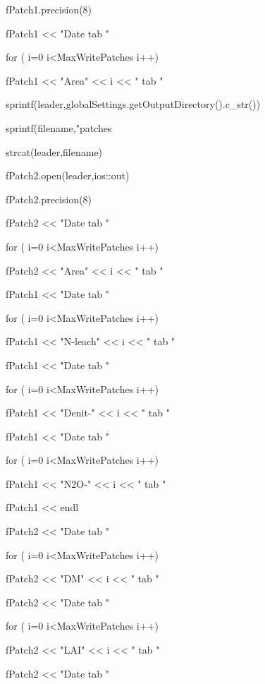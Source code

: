 \documentclass[%
]{scrartcl}
\begin{document}
      \quad fPatch1.precision(8)
      
      \quad fPatch1 << "Date tab "
      
      \quad for ( i=0 i<MaxWritePatches i++)
      
       \quad \quad   fPatch1 << "Area" << i << " tab "


      \quad \quad sprintf(leader,globalSettings.getOutputDirectory().c\_str())
	  
	  \quad  \quad sprintf(filename,"patches%
      
       \quad strcat(leader,filename)
     
       \quad fPatch2.open(leader,ios::out)
     
      \quad fPatch2.precision(8)
     
      \quad fPatch2 << "Date tab "
     
      \quad for ( i=0 i<MaxWritePatches i++)
     
      \quad \quad    fPatch2 << "Area" << i << " tab "

     \quad  fPatch1 << "Date tab "
      
     \quad  for ( i=0 i<MaxWritePatches i++)
       
     \quad    \quad  fPatch1 << "N-leach" << i << " tab "
      
     \quad  fPatch1 << "Date tab "
      
      \quad for ( i=0 i<MaxWritePatches i++)
      
     \quad   \quad   fPatch1 << "Denit-" << i << " tab "
     
    \quad   fPatch1 << "Date tab "
     
     \quad  for ( i=0 i<MaxWritePatches i++)
     
     \quad  \quad    fPatch1 << "N2O-" << i << " tab "
      
     \quad  fPatch1 << endl


      \quad fPatch2 << "Date tab "
     
    \quad   for ( i=0 i<MaxWritePatches i++)
    
    \quad  \quad     fPatch2 << "DM" << i << " tab "
     
      \quad fPatch2 << "Date tab "
     
     \quad  for ( i=0 i<MaxWritePatches i++)
      
    \quad \quad      fPatch2 << "LAI" << i << " tab "
    
    \quad   fPatch2 << "Date tab "
     
\end{document}

